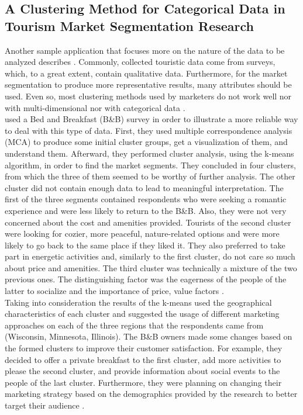 \subsection{A Clustering Method for Categorical Data in Tourism Market Segmentation Research}
Another sample application that focuses more on the nature of the data to be analyzed describes \textcite{categorical}. Commonly, collected touristic data come from surveys, which, to a great extent, contain qualitative data. Furthermore, for the market segmentation to produce more representative results, many attributes should be used. Even so, most clustering methods used by marketers do not work well nor with multi-dimensional nor with categorical data \autocite[391]{categorical}. \\
\textcite{categorical} used a Bed and Breakfast (B\&B) survey in order to illustrate a more reliable way to deal with this type of data. First, they used multiple correspondence analysis (MCA) to produce some initial cluster groups, get a visualization of them, and understand them. Afterward, they performed cluster analysis, using the k-means algorithm, in order to find the market segments. They concluded in four clusters, from which the three of them seemed to be worthy of further analysis. The other cluster did not contain enough data to lead to meaningful interpretation. The first of the three segments contained respondents who were seeking a romantic experience and were less likely to return to the B\&B. Also, they were not very concerned about the cost and amenities provided. Tourists of the second cluster were looking for cozier, more peaceful, nature-related options and were more likely to go back to the same place if they liked it. They also preferred to take part in energetic activities and, similarly to the first cluster, do not care so much about price and amenities. The third cluster was technically a mixture of the two previous ones. The distinguishing factor was the eagerness of the people of the latter to socialize and the importance of price, value factors \autocite[394-395]{categorical}. \\
Taking into consideration the results of the k-means \textcite{categorical} used the geographical characteristics of each cluster and suggested the usage of different marketing approaches on each of the three regions that the respondents came from (Wisconsin, Minnesota, Illinois). The B\&B owners made some changes based on the formed clusters to improve their customer satisfaction. For example, they decided to offer a private breakfast to the first cluster, add more activities to please the second cluster, and provide information about social events to the people of the last cluster. Furthermore, they were planning on changing their marketing strategy based on the demographics provided by the research to better target their audience \autocite[395-396]{categorical}.